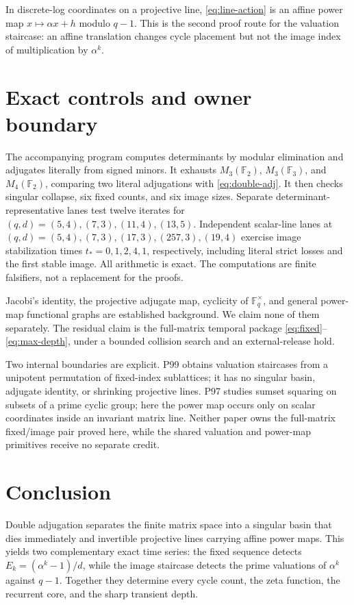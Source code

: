 \documentclass[11pt,a4paper]{amsart}
\theoremstyle{definition}
\theoremstyle{remark}
\newcommand{\F}{\mathbb F}
\begin{document}
In discrete-log coordinates on a projective line,
\eqref{eq:line-action} is an affine power map
$x\mapsto\alpha x+h$ modulo $q-1$.  This is the second proof route for the
valuation staircase: an affine translation changes cycle placement but not
the image index of multiplication by $\alpha^k$.

\section{Exact controls and owner boundary}

The accompanying program computes determinants by modular elimination and
adjugates literally from signed minors.  It exhausts
$M_3(\F_2)$, $M_3(\F_3)$, and $M_4(\F_2)$, comparing two literal
adjugations with \eqref{eq:double-adj}.  It then checks singular collapse,
six fixed counts, and six image sizes.  Separate determinant-representative
lanes test twelve iterates for $(q,d)=(5,4),(7,3),(11,4),(13,5)$.
Independent scalar-line lanes at $(q,d)=(5,4),(7,3),(17,3),(257,3),(19,4)$
exercise image stabilization times $t_*=0,1,2,4,1$, respectively, including
literal strict losses and the first stable image.
All arithmetic is exact.  The computations are finite falsifiers, not a
replacement for the proofs.

Jacobi's identity, the projective adjugate map, cyclicity of
$\F_q^\times$, and general power-map functional graphs are established
background.  We claim none of them separately.  The residual claim is the
full-matrix temporal package \eqref{eq:fixed}--\eqref{eq:max-depth}, under
a bounded collision search and an external-release hold.

Two internal boundaries are explicit.  P99 obtains valuation staircases from
a unipotent permutation of fixed-index sublattices; it has no singular basin,
adjugate identity, or shrinking projective lines.  P97 studies sumset
squaring on subsets of a prime cyclic group; here the power map occurs only
on scalar coordinates inside an invariant matrix line.  Neither paper owns
the full-matrix fixed/image pair proved here, while the shared valuation and
power-map primitives receive no separate credit.

\section{Conclusion}

Double adjugation separates the finite matrix space into a singular basin
that dies immediately and invertible projective lines carrying affine power
maps.  This yields two complementary exact time series: the fixed sequence
detects $E_k=(\alpha^k-1)/d$, while the image staircase detects the prime
valuations of $\alpha^k$ against $q-1$.  Together they determine every
cycle count, the zeta function, the recurrent core, and the sharp transient
depth.



\end{document}
